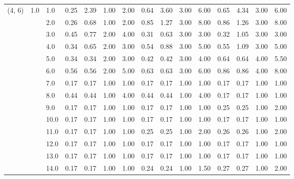 \begin{tabular}{lllrrrrrrrrrrrr}
(4, 6) & 1.0 & 1.0  &       0.25 &      2.39 & 1.00 &   2.00 &       0.64 &      3.60 &  3.00 &   6.00 &       0.65 &      4.34 &  3.00 &   6.00 \\
       &     & 2.0  &       0.26 &      0.68 & 1.00 &   2.00 &       0.85 &      1.27 &  3.00 &   8.00 &       0.86 &      1.26 &  3.00 &   8.00 \\
       &     & 3.0  &       0.45 &      0.77 & 2.00 &   4.00 &       0.31 &      0.63 &  3.00 &   3.00 &       0.32 &      1.05 &  3.00 &   3.00 \\
       &     & 4.0  &       0.34 &      0.65 & 2.00 &   3.00 &       0.54 &      0.88 &  3.00 &   5.00 &       0.55 &      1.09 &  3.00 &   5.00 \\
       &     & 5.0  &       0.34 &      0.34 & 2.00 &   3.00 &       0.42 &      0.42 &  3.00 &   4.00 &       0.64 &      0.64 &  4.00 &   5.50 \\
       &     & 6.0  &       0.56 &      0.56 & 2.00 &   5.00 &       0.63 &      0.63 &  3.00 &   6.00 &       0.86 &      0.86 &  4.00 &   8.00 \\
       &     & 7.0  &       0.17 &      0.17 & 1.00 &   1.00 &       0.17 &      0.17 &  1.00 &   1.00 &       0.17 &      0.17 &  1.00 &   1.00 \\
       &     & 8.0  &       0.44 &      0.44 & 1.00 &   4.00 &       0.44 &      0.44 &  1.00 &   4.00 &       0.17 &      0.17 &  1.00 &   1.00 \\
       &     & 9.0  &       0.17 &      0.17 & 1.00 &   1.00 &       0.17 &      0.17 &  1.00 &   1.00 &       0.25 &      0.25 &  1.00 &   2.00 \\
       &     & 10.0 &       0.17 &      0.17 & 1.00 &   1.00 &       0.17 &      0.17 &  1.00 &   1.00 &       0.17 &      0.17 &  1.00 &   1.00 \\
       &     & 11.0 &       0.17 &      0.17 & 1.00 &   1.00 &       0.25 &      0.25 &  1.00 &   2.00 &       0.26 &      0.26 &  1.00 &   2.00 \\
       &     & 12.0 &       0.17 &      0.17 & 1.00 &   1.00 &       0.17 &      0.17 &  1.00 &   1.00 &       0.17 &      0.17 &  1.00 &   1.00 \\
       &     & 13.0 &       0.17 &      0.17 & 1.00 &   1.00 &       0.17 &      0.17 &  1.00 &   1.00 &       0.17 &      0.17 &  1.00 &   1.00 \\
       &     & 14.0 &       0.17 &      0.17 & 1.00 &   1.00 &       0.24 &      0.24 &  1.00 &   1.50 &       0.27 &      0.27 &  1.00 &   2.00 \\

\end{tabular}
